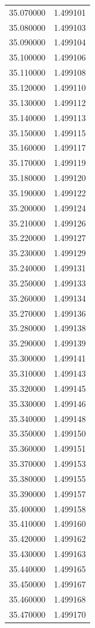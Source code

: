 \begin{tabular}{rr}
35.070000 & 1.499101 \\
35.080000 & 1.499103 \\
35.090000 & 1.499104 \\
35.100000 & 1.499106 \\
35.110000 & 1.499108 \\
35.120000 & 1.499110 \\
35.130000 & 1.499112 \\
35.140000 & 1.499113 \\
35.150000 & 1.499115 \\
35.160000 & 1.499117 \\
35.170000 & 1.499119 \\
35.180000 & 1.499120 \\
35.190000 & 1.499122 \\
35.200000 & 1.499124 \\
35.210000 & 1.499126 \\
35.220000 & 1.499127 \\
35.230000 & 1.499129 \\
35.240000 & 1.499131 \\
35.250000 & 1.499133 \\
35.260000 & 1.499134 \\
35.270000 & 1.499136 \\
35.280000 & 1.499138 \\
35.290000 & 1.499139 \\
35.300000 & 1.499141 \\
35.310000 & 1.499143 \\
35.320000 & 1.499145 \\
35.330000 & 1.499146 \\
35.340000 & 1.499148 \\
35.350000 & 1.499150 \\
35.360000 & 1.499151 \\
35.370000 & 1.499153 \\
35.380000 & 1.499155 \\
35.390000 & 1.499157 \\
35.400000 & 1.499158 \\
35.410000 & 1.499160 \\
35.420000 & 1.499162 \\
35.430000 & 1.499163 \\
35.440000 & 1.499165 \\
35.450000 & 1.499167 \\
35.460000 & 1.499168 \\
35.470000 & 1.499170 \\

\end{tabular}
